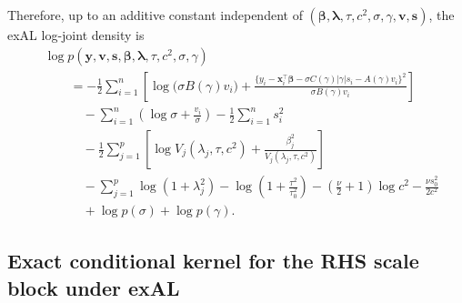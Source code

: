 \documentclass[11pt]{article}
\newcommand{\vect}[1]{\boldsymbol{#1}}
\begin{document}
Therefore, up to an additive constant independent of
$(\vect{\beta},\vect{\lambda},\tau,c^2,\sigma,\gamma,\vect{v},\vect{s})$, the exAL log-joint density is
\begin{align}
  &\log p(\vect{y},\vect{v},\vect{s},\vect{\beta},\vect{\lambda},\tau,c^2,\sigma,\gamma)
  \nonumber\\
  &\qquad=
  -\frac{1}{2}\sum_{i=1}^n
  \left[
    \log\!\big(\sigma B(\gamma) v_i\big)
    +
    \frac{
      \big\{
        y_i - \vect{x}_i^\top \vect{\beta}
        - \sigma C(\gamma)\lvert\gamma\rvert s_i
        - A(\gamma) v_i
      \big\}^2
    }{
      \sigma B(\gamma) v_i
    }
  \right]
  \nonumber\\
  &\qquad\quad
  - \sum_{i=1}^n \left(\log \sigma + \frac{v_i}{\sigma}\right)
  - \frac{1}{2}\sum_{i=1}^n s_i^2
  \nonumber\\
  &\qquad\quad
  - \frac{1}{2}\sum_{j=1}^p
  \left[
    \log V_j(\lambda_j,\tau,c^2)
    +
    \frac{\beta_j^2}{V_j(\lambda_j,\tau,c^2)}
  \right]
  \nonumber\\
  &\qquad\quad
  - \sum_{j=1}^p \log(1+\lambda_j^2)
  - \log\!\left(1+\frac{\tau^2}{\tau_0^2}\right)
  - \left(\frac{\nu}{2}+1\right)\log c^2
  - \frac{\nu s_0^2}{2c^2}
  \nonumber\\
  &\qquad\quad
  + \log p(\sigma) + \log p(\gamma).
  \label{eq:logjoint-exAL-RHS}
\end{align}

\subsection{Exact conditional kernel for the RHS scale block under exAL}
\end{document}
